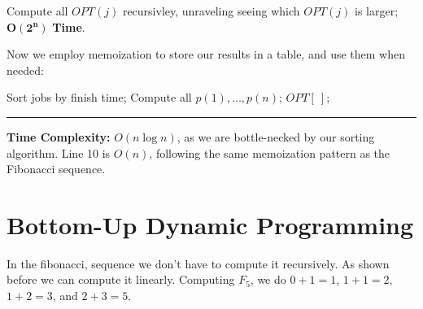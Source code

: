 \vspace{-1em}
\begin{Func}
    
    \vspace{-.5em}
    Compute all $OPT(j)$ recursivley, unraveling seeing which $OPT(j)$ is larger; $\mathbf{O(2^n)}$ \textbf{Time}.\\
        \begin{algorithm}[H]
            \SetAlgoLined
        \end{algorithm}
    \end{Func}

    \newpage

    \noindent
    Now we employ memoization to store our results in a table, and use them when needed:

    \begin{Func}
        
        \vspace{-.5em}
        \begin{algorithm}[H]
            Sort jobs by finish time; 
            Compute all $p(1),\dots,p(n)$; 
            $OPT[\ ]$; 
        \end{algorithm}
        \rule{\textwidth}{0.4pt}
        \textbf{Time Complexity:} $O(n\log n)$, as we are bottle-necked by our sorting algorithm. Line 10 is $O(n)$, following 
        the same memoization pattern as the Fibonacci sequence.
    \end{Func}

    \vspace{-2em}
    \section{Bottom-Up Dynamic Programming}
    In the fibonacci, sequence we don't have to compute it recursively. As shown before we can compute it linearly. Computing $F_5$, we do $0+1=1$, $1+1=2$, $1+2=3$, and $2+3=5$.
    
